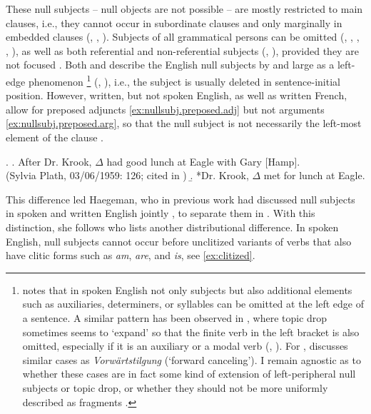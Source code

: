 These null subjects -- null objects are not possible \citep[172]{haegeman1990} -- are mostly restricted to main clauses, i.e., they cannot occur in subordinate clauses and only marginally in embedded  clauses (\cite[168]{haegeman1990}, \cite[98]{haegeman2007}, \cite[108]{weir2012}).
Subjects of all grammatical persons can be omitted (\cite[238]{haegeman1997}, \cite[133]{haegeman2000}, \cite[95]{haegeman2007}, \cite[233]{haegeman2017}, \cite[106]{weir2012}), as well as both referential and non-referential subjects (\cite[236]{haegeman1997}, \cite[233]{haegeman2017}), provided they are not focused  \citep[108]{weir2012}.
Both \citet{weir2012} and \citet{haegeman2000} describe the English null subjects by and large as a left-edge phenomenon%
\footnote{\citet[109]{weir2012} notes that in spoken English not only subjects but also additional elements such as auxiliaries,  determiners,  or syllables can be omitted at the left edge of a sentence.
A similar pattern has been observed in , where topic drop sometimes seems to `expand' so that the finite verb in the left bracket is also omitted, especially if it is an auxiliary  or a modal verb  (\cite[333]{eide.sollid2011}, \cite[173]{nygard2014}).
For , \citet[161--164]{wilder1996} discusses similar cases as \textit{Vorwärtstilgung} (`forward canceling').
I remain agnostic as to whether these cases are in fact some kind of extension of left-peripheral null subjects or topic drop, or whether they should not be more uniformly described as fragments  \citep[e.g.,][]{morgan1973,merchant2004,reich2007,lemke2021}.
 } 
%
 (\cite[109]{weir2012}, \cite[139]{haegeman2000}), i.e., the subject is usually  deleted in sentence-initial position.
However, written, but not spoken English, as well as written French, allow for preposed adjuncts  \ref{ex:nullsubj.preposed.adj} but not arguments  \ref{ex:nullsubj.preposed.arg}, so that the null subject is not necessarily the left-most element of the clause \citep[148]{haegeman2000}.

\ex.\label{ex:nullsubj.preposed} 
\a. \label{ex:nullsubj.preposed.adj} After Dr. Krook, $\Delta$ had good lunch at Eagle with Gary [Hamp]. \\(Sylvia Plath, 03/06/1959: 126; cited in \cite[149]{haegeman2000})
\b.\label{ex:nullsubj.preposed.arg}  *Dr. Krook, $\Delta$ met for lunch at Eagle. \citep[149]{haegeman2000}
	
This difference led Haegeman, who in previous work had discussed null subjects in spoken and written English jointly \citep{haegeman1997, haegeman2013}, to separate them in \citet{haegeman2017}.
With this distinction, she follows \citet{weir2012}  who lists another distributional difference.
In spoken English, null subjects cannot occur before unclitized variants of verbs that also have clitic forms such as \textit{am}, \textit{are}, and \textit{is}, see \ref{ex:clitized}.

